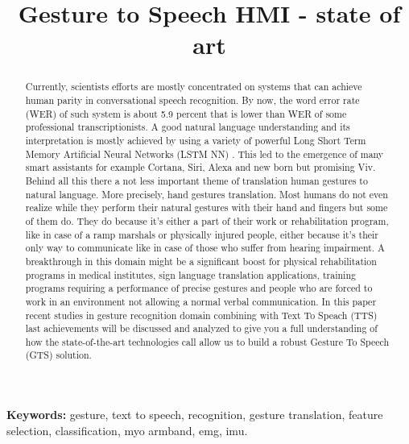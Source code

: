\documentclass[conference,compsoc]{IEEEtran}
\begin{document}
\title{Gesture to Speech HMI - state of art}

\author{
\and
{}
}
\maketitle


\begin{abstract}
Currently, scientists efforts are mostly concentrated on systems that can achieve human parity in conversational speech recognition. By now, the word error rate (WER) of such system is about 5.9 percent that is lower than WER of some professional transcriptionists. A good natural language understanding and its interpretation is mostly achieved by using a variety of powerful Long Short Term Memory Artificial Neural Networks (LSTM NN) \cite{lstm1}. This led to the emergence of many smart assistants for example Cortana, Siri, Alexa and new born but promising Viv. Behind all this there a not less important theme of translation human gestures to natural language. More precisely, hand gestures translation. Most humans do not even realize while they perform their natural gestures with their hand and fingers but some of them do. They do because it's either a part of their work or rehabilitation program, like in case of a ramp marshals or physically injured people, either because it's their only way to communicate like in case of those who suffer from hearing impairment. A breakthrough in this domain might be a significant boost for physical rehabilitation programs in medical institutes, sign language translation applications, training programs requiring a performance of precise gestures and people who are forced to work in an environment not allowing a normal verbal communication. In this paper recent studies in gesture recognition domain combining with Text To Speach (TTS) last achievements \cite{wavenet} will be discussed and analyzed to give you a full understanding of how the state-of-the-art technologies call allow us to build a robust Gesture To Speech (GTS) solution.


\end{abstract}
\textbf{Keywords:} gesture, text to speech, recognition, gesture translation, feature selection, classification, myo armband, emg, imu.
\end{document}
